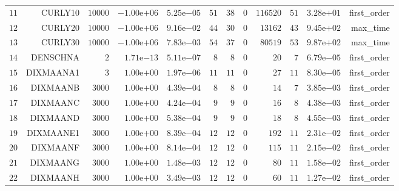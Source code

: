 \begin{longtable}{rrrrrrrrrrrr}
  \(    11\) & CURLY10 & \( 10000\) & \(-1.00\)e\(+06\) & \( 5.25\)e\(-05\) & \(    51\) & \(    38\) & \(     0\) & \(116520\) & \(    51\) & \( 3.28\)e\(+01\) & first\_order \\
  \(    12\) & CURLY20 & \( 10000\) & \(-1.00\)e\(+06\) & \( 9.16\)e\(-02\) & \(    44\) & \(    30\) & \(     0\) & \( 13162\) & \(    43\) & \( 9.45\)e\(+02\) & max\_time \\
  \(    13\) & CURLY30 & \( 10000\) & \(-1.00\)e\(+06\) & \( 7.83\)e\(-03\) & \(    54\) & \(    37\) & \(     0\) & \( 80519\) & \(    53\) & \( 9.87\)e\(+02\) & max\_time \\
  \(    14\) & DENSCHNA & \(     2\) & \( 1.71\)e\(-13\) & \( 5.11\)e\(-07\) & \(     8\) & \(     8\) & \(     0\) & \(    20\) & \(     7\) & \( 6.79\)e\(-05\) & first\_order \\
  \(    15\) & DIXMAANA1 & \(     3\) & \( 1.00\)e\(+00\) & \( 1.97\)e\(-06\) & \(    11\) & \(    11\) & \(     0\) & \(    27\) & \(    11\) & \( 8.30\)e\(-05\) & first\_order \\
  \(    16\) & DIXMAANB & \(  3000\) & \( 1.00\)e\(+00\) & \( 4.39\)e\(-04\) & \(     8\) & \(     8\) & \(     0\) & \(    14\) & \(     7\) & \( 3.85\)e\(-03\) & first\_order \\
  \(    17\) & DIXMAANC & \(  3000\) & \( 1.00\)e\(+00\) & \( 4.24\)e\(-04\) & \(     9\) & \(     9\) & \(     0\) & \(    16\) & \(     8\) & \( 4.38\)e\(-03\) & first\_order \\
  \(    18\) & DIXMAAND & \(  3000\) & \( 1.00\)e\(+00\) & \( 5.38\)e\(-04\) & \(     9\) & \(     9\) & \(     0\) & \(    18\) & \(     8\) & \( 4.55\)e\(-03\) & first\_order \\
  \(    19\) & DIXMAANE1 & \(  3000\) & \( 1.00\)e\(+00\) & \( 8.39\)e\(-04\) & \(    12\) & \(    12\) & \(     0\) & \(   192\) & \(    11\) & \( 2.31\)e\(-02\) & first\_order \\
  \(    20\) & DIXMAANF & \(  3000\) & \( 1.00\)e\(+00\) & \( 8.14\)e\(-04\) & \(    12\) & \(    12\) & \(     0\) & \(   115\) & \(    11\) & \( 2.15\)e\(-02\) & first\_order \\
  \(    21\) & DIXMAANG & \(  3000\) & \( 1.00\)e\(+00\) & \( 1.48\)e\(-03\) & \(    12\) & \(    12\) & \(     0\) & \(    80\) & \(    11\) & \( 1.58\)e\(-02\) & first\_order \\
  \(    22\) & DIXMAANH & \(  3000\) & \( 1.00\)e\(+00\) & \( 3.49\)e\(-03\) & \(    12\) & \(    12\) & \(     0\) & \(    60\) & \(    11\) & \( 1.27\)e\(-02\) & first\_order \\

\end{longtable}
